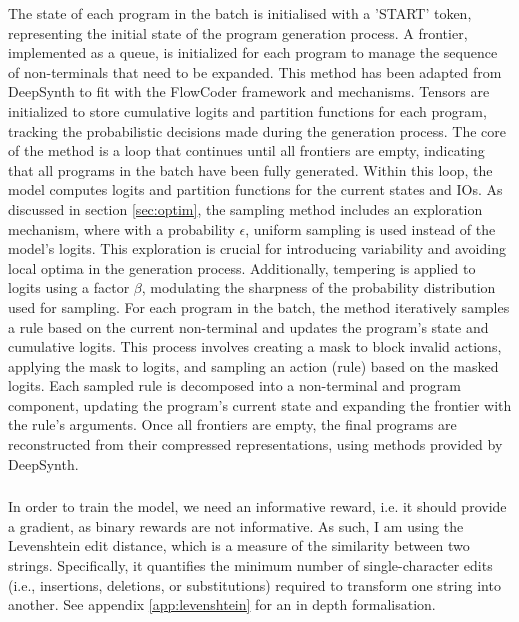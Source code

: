 The state of each program in the batch is initialised with a 'START' token, representing the initial state of the program generation process. A frontier, implemented as a queue, is initialized for each program to manage the sequence of non-terminals that need to be expanded. This method has been adapted from DeepSynth to fit with the FlowCoder framework and mechanisms. 
Tensors are initialized to store cumulative logits and partition functions for each program, tracking the probabilistic decisions made during the generation process.
The core of the method is a loop that continues until all frontiers are empty, indicating that all programs in the batch have been fully generated. Within this loop, the model computes logits and partition functions for the current states and IOs.
As discussed in section \ref{sec:optim}, the sampling method includes an exploration mechanism, where with a probability $\epsilon$, uniform sampling is used instead of the model's logits. This exploration is crucial for introducing variability and avoiding local optima in the generation process. Additionally, tempering is applied to logits using a factor $\beta$, modulating the sharpness of the probability distribution used for sampling.
For each program in the batch, the method iteratively samples a rule based on the current non-terminal and updates the program's state and cumulative logits. This process involves creating a mask to block invalid actions, applying the mask to logits, and sampling an action (rule) based on the masked logits.
Each sampled rule is decomposed into a non-terminal and program component, updating the program's current state and expanding the frontier with the rule's arguments.
Once all frontiers are empty, the final programs are reconstructed from their compressed representations, using methods provided by DeepSynth.


\subsubsection{}

In order to train the model, we need an informative reward, i.e. it should provide a gradient, as binary rewards are not informative. As such, I am using the Levenshtein edit distance, which is a measure of the similarity between two strings. Specifically, it quantifies the minimum number of single-character edits (i.e., insertions, deletions, or substitutions) required to transform one string into another. See appendix \ref{app:levenshtein} for an in depth formalisation.

